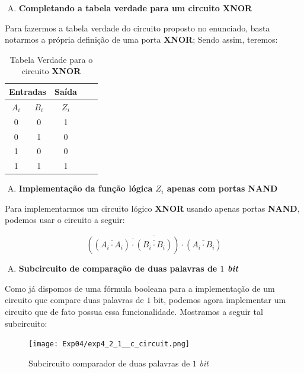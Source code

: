 \documentclass[12pt]{article}
\begin{document}
\begin{enumerate}[A)]
\item \textbf{Completando a tabela verdade para um circuito \textbf{XNOR}}
\end{enumerate}

Para fazermos a tabela verdade do circuito proposto no enunciado, basta notarmos
a própria definição de uma porta \textbf{XNOR}; Sendo assim, teremos:

\begin{table}[H]
    \centering
    \caption{Tabela Verdade para o circuito \textbf{XNOR}}
    \begin{tabular}{|c|c|c|c|c|}\hline
    \multicolumn{2}{|c|}{Entradas} & \multicolumn{1}{|c|}{Saída} \\\hline
    $A_{i}$ & $B_{i}$ & $Z_{i}$ \\\hline
    0 & 0 & 1 \\\hline
    0 & 1 & 0 \\\hline
    1 & 0 & 0 \\\hline
    1 & 1 & 1 \\\hline
    \end{tabular}\label{tab:comparador_de_palavras_3_bits}
\end{table}

\begin{enumerate}[B)]
\item \textbf{Implementação da função lógica $Z_{i}$ apenas com portas NAND}
\end{enumerate}

Para implementarmos um circuito lógico \textbf{XNOR} usando apenas portas
\textbf{NAND}, podemos usar o circuito a seguir:

\begin{equation}
\overline{\left( \overline{(\overline{A_{i} \cdot A_{i}}) \cdot (\overline{B_{i} \cdot B_{i}})} \right) \cdot (\overline{A_{i} \cdot B_{i}})}
\end{equation}

\begin{enumerate}[C)]
\item \textbf{Subcircuito de comparação de duas palavras de $1$ \emph{bit}}
\end{enumerate}

Como já dispomos de uma fórmula booleana para a implementação de um circuito que
compare duas palavras de $1$ bit, podemos agora implementar um circuito que de
fato possua essa funcionalidade. Mostramos a seguir tal subcircuito:

\begin{figure}[H]
    \centering
    \texttt{[image: Exp04/exp4\_2\_1\_\_c\_circuit.png]}
    \caption{Subcircuito comparador de duas palavras de $1$ \emph{bit}}\label{fig:exp4_2_1__c_circuit.png}
\end{figure}
\end{document}
